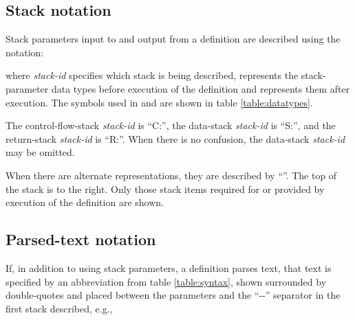 \subsection{Stack notation}

Stack parameters input to and output from a definition are described
using the notation:
\begin{quote}
\end{quote}

where \emph{stack-id} specifies which stack is being described,
 represents the stack-parameter data types before
execution of the definition and  represents them
after execution. The symbols used in  and 
are shown in table \ref{table:datatypes}.

The control-flow-stack \emph{stack-id} is ``C:'', the data-stack
\emph{stack-id} is ``S:'', and the return-stack \emph{stack-id}
is ``R:''. When there is no confusion, the data-stack
\emph{stack-id} may be omitted.

When there are alternate  representations, they are
described by ``''. The top of the stack is
to the right. Only those stack items required for or provided by
execution of the definition are shown.


\subsection{Parsed-text notation}

If, in addition to using stack parameters, a definition parses text,
that text is specified by an abbreviation from table \ref{table:syntax},
shown surrounded by double-quotes and placed between the 
parameters and the ``-{}-'' separator in the first stack described, e.g.,

\begin{quote}
\end{quote}

